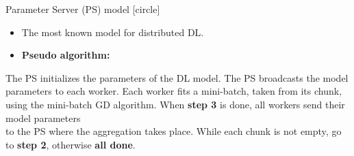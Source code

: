 \begin{frame}{Parameter Server (PS) model}
    [circle]
    \begin{itemize}
        \item{The most known model for distributed DL.}
        \vspace{0.2cm}
        \item{\textbf{Pseudo algorithm:}}
    \end{itemize}
    \vspace{0.1cm}
    \begin{algorithm}[H]
        \begin{algorithmic}[1]
            \STATE The PS initializes the parameters of the DL model.
            \STATE The PS broadcasts the model parameters to each worker.
            \STATE Each worker fits a mini-batch, taken from its chunk, using the mini-batch GD algorithm.
            \STATE When \textbf{step 3} is done, all workers send their model parameters\\to the PS where the aggregation takes place.
            \STATE While each chunk is not empty, go to \textbf{step 2}, otherwise \textbf{all done}.
        \end{algorithmic}
        \label{alg:param-server}
    \end{algorithm}
\end{frame}

